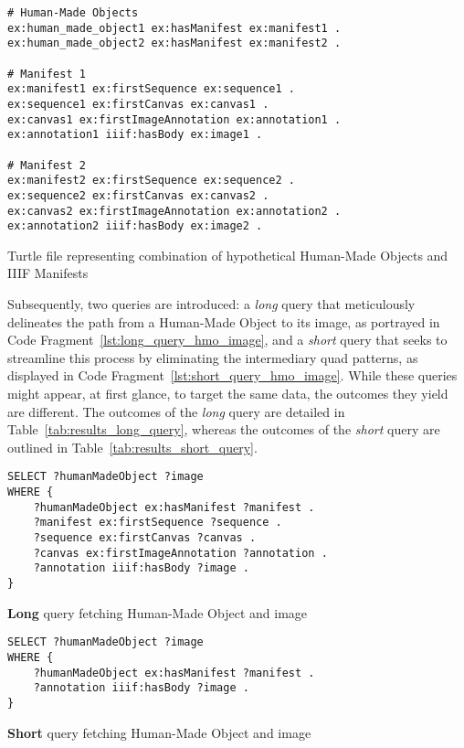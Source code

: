 \begin{listing}[htbp]
    \begin{verbatim}
# Human-Made Objects
ex:human_made_object1 ex:hasManifest ex:manifest1 .
ex:human_made_object2 ex:hasManifest ex:manifest2 .

# Manifest 1
ex:manifest1 ex:firstSequence ex:sequence1 .
ex:sequence1 ex:firstCanvas ex:canvas1 .
ex:canvas1 ex:firstImageAnnotation ex:annotation1 .
ex:annotation1 iiif:hasBody ex:image1 .

# Manifest 2
ex:manifest2 ex:firstSequence ex:sequence2 .
ex:sequence2 ex:firstCanvas ex:canvas2 .
ex:canvas2 ex:firstImageAnnotation ex:annotation2 .
ex:annotation2 iiif:hasBody ex:image2 .
    \end{verbatim}
    \caption{Turtle file representing combination of hypothetical Human-Made Objects and IIIF Manifests}
    \label{lst:turtle_hypothetical_combination}
\end{listing}

Subsequently, two queries are introduced: a \textit{long} query that meticulously delineates the path from a Human-Made Object to its image, as portrayed in Code Fragment~\ref{lst:long_query_hmo_image}, and a \textit{short} query that seeks to streamline this process by eliminating the intermediary quad patterns, as displayed in Code Fragment~\ref{lst:short_query_hmo_image}. While these queries might appear, at first glance, to target the same data, the outcomes they yield are different. The outcomes of the \textit{long} query are detailed in Table~\ref{tab:results_long_query}, whereas the outcomes of the \textit{short} query are outlined in Table~\ref{tab:results_short_query}.

\begin{listing}[htbp]
    \begin{verbatim}
SELECT ?humanMadeObject ?image
WHERE {
    ?humanMadeObject ex:hasManifest ?manifest .
    ?manifest ex:firstSequence ?sequence .
    ?sequence ex:firstCanvas ?canvas .
    ?canvas ex:firstImageAnnotation ?annotation .
    ?annotation iiif:hasBody ?image .
}
    \end{verbatim}
    \caption{\textbf{Long} query fetching Human-Made Object and image}
    \label{lst:long_query_hmo_image}
\end{listing}

\begin{listing}[htbp]
    \begin{verbatim}
SELECT ?humanMadeObject ?image
WHERE {
    ?humanMadeObject ex:hasManifest ?manifest .
    ?annotation iiif:hasBody ?image .
}
    \end{verbatim}
    \caption{\textbf{Short} query fetching Human-Made Object and image}
    \label{lst:short_query_hmo_image}
\end{listing}

